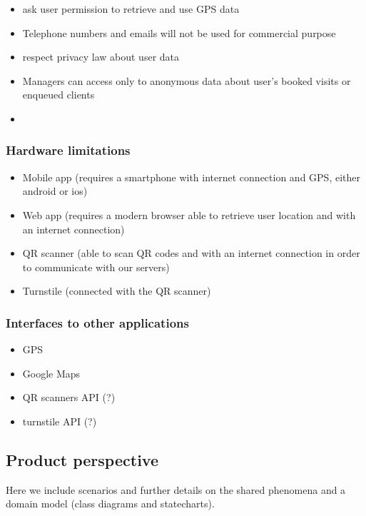 \begin{itemize}
    \item ask user permission to retrieve and use GPS data
    \item Telephone numbers and emails will not be used for commercial purpose
    \item respect privacy law about user data
    \item Managers can access only to anonymous data about user's booked visits or enqueued clients
    \item 
\end{itemize}

\subsubsection{Hardware limitations}
\label{subsubsect:hardwarelimitations}

\begin{itemize}
    \item Mobile app (requires a smartphone with internet connection and GPS, either android or ios)
    \item Web app (requires a modern browser able to retrieve user location and with an internet connection)
    \item QR scanner (able to scan QR codes and with an internet connection in order to communicate with our servers)
    \item Turnstile (connected with the QR scanner)
\end{itemize}


\subsubsection{Interfaces to other applications}
\label{subsubsect:interfacestootherappications}

\begin{itemize}
    \item GPS
    \item Google Maps
    \item QR scanners API (?)
    \item turnstile API (?)
\end{itemize}

\subsection{Product perspective}
\label{subsect:productperspective}

Here we include scenarios and further details on the shared phenomena and a domain model (class diagrams and statecharts).

